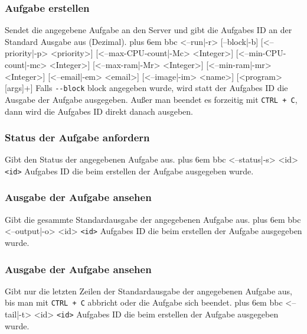 \documentclass[a4paper,12pt]{article}
\makeatletter
\newenvironment{mycode}
 {\def\@xobeysp{\ }\verbatim\rightskip=0pt plus 6em\relax}
 {\endverbatim}
\makeatother
\begin{document}
\subsubsection{Aufgabe erstellen}
Sendet die angegebene \gls{Aufgabe} an den \gls{Server} und gibt die \glspl{Aufgabe} ID an der Standard Ausgabe aus (Dezimal).
\begin{mycode}
bbc <--run|-r> [--block|-b] [<--priority|-p> <priority>] [<--max-\gls{CPU}-count|-Mc> <Integer>] [<--min-\gls{CPU}-count|-mc> <Integer>] [<--max-ram|-Mr> <Integer>] [<--min-ram|-mr> <Integer>] [<--email|-em> <email>] [<--image|-im> <name>] [<program> [args]+]
\end{mycode}
Falls \texttt{-{}-block} block angegeben wurde, wird statt der \glspl{Aufgabe} ID die Ausgabe der \gls{Aufgabe} ausgegeben.
Außer man beendet es forzeitig mit \texttt{CTRL + C}, dann wird die \glspl{Aufgabe} ID direkt danach ausgeben.

\subsubsection{Status der \gls{Aufgabe} anfordern}
Gibt den Status der angegebenen \gls{Aufgabe} aus.
\begin{mycode}
bbc <--status|-s> <id>
\end{mycode}
\texttt{<id>} \glspl{Aufgabe} ID die beim erstellen der \gls{Aufgabe} ausgegeben wurde.

\subsubsection{Ausgabe der \gls{Aufgabe} ansehen}
Gibt die gesammte Standardausgabe der angegebenen \gls{Aufgabe} aus.
\begin{mycode}
bbc <--output|-o> <id>
\end{mycode}
\texttt{<id>} \glspl{Aufgabe} ID die beim erstellen der \gls{Aufgabe} ausgegeben wurde.

\subsubsection{Ausgabe der \gls{Aufgabe} ansehen}
Gibt nur die letzten Zeilen der Standardausgabe der angegebenen \gls{Aufgabe} aus, bis man mit \texttt{CTRL + C} abbricht oder die \gls{Aufgabe} sich beendet.
\begin{mycode}
bbc <--tail|-t> <id>
\end{mycode}
\texttt{<id>} \glspl{Aufgabe} ID die beim erstellen der \gls{Aufgabe} ausgegeben wurde.
\end{document}
